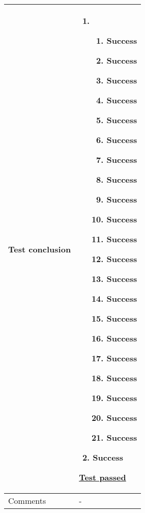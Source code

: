 \begin{center}
\begin{longtable}{ | p{4cm} | p{10cm} | }
			Test conclusion & 	\begin{enumerate}
							\item
							\begin{enumerate}
								\item Success
								\item Success
								\item Success
								\item Success
								\item Success
								\item Success								
								\item Success
								\item Success
								\item Success
								\item Success
								\item Success								
								\item Success
								\item Success
								\item Success
								\item Success
								\item Success
								\item Success
								\item Success
								\item Success
								\item Success
								\item Success
							\end{enumerate}
							\item Success
						\end{enumerate}
						\underline{Test passed} \\ [3pt] \hline

			Comments & -
					\\ [3pt] \hline
\end{longtable}
\end{center}

